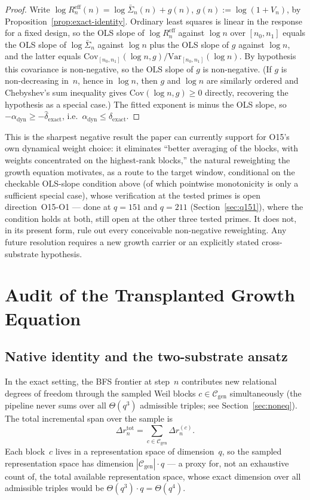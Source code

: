 \documentclass[11pt,a4paper]{article}
\newcommand{\Sn}{\bar{\Sigma}_n}
\newcommand{\dexact}{\hat{\delta}_{\mathrm{exact}}}
\newcommand{\Reff}{R_n^{\mathrm{eff}}}
\begin{document}
\begin{proof}
Write $\log\Reff(n) = \log\Sn(n) + g(n)$, $g(n):=\log(1+V_n)$, by
Proposition~\ref{prop:exact-identity}.
Ordinary least squares is linear in the response for a fixed design, so the
OLS slope of $\log\Reff$ against $\log n$ over $[n_0,n_1]$ equals the OLS
slope of $\log\Sn$ against $\log n$ plus the OLS slope of $g$ against
$\log n$, and the latter equals $\mathrm{Cov}_{[n_0,n_1]}(\log n,g)/
\mathrm{Var}_{[n_0,n_1]}(\log n)$.
By hypothesis this covariance is non-negative, so the OLS slope of $g$
is non-negative.
(If $g$ is non-decreasing in~$n$, hence in $\log n$, then $g$ and $\log n$
are similarly ordered and Chebyshev's sum inequality gives
$\mathrm{Cov}(\log n,g)\geq0$ directly, recovering the hypothesis as a
special case.)
The fitted exponent is minus the OLS slope, so
$-\alpha_{\mathrm{dyn}} \geq -\dexact$, i.e.\ $\alpha_{\mathrm{dyn}}\leq\dexact$.
\end{proof}

This is the sharpest negative result the paper can currently support for
O15's own dynamical weight choice: it eliminates ``better averaging of the
blocks, with weights concentrated on the highest-rank blocks,'' the natural
reweighting the growth equation motivates, as a route to the target window,
conditional on the checkable OLS-slope condition above (of which pointwise
monotonicity is only a sufficient special case), whose verification at the
tested primes is open direction~O15-O1 --- done at $q=151$ and $q=211$
(Section~\ref{sec:q151}), where the condition holds at both, still open
at the other three tested primes.
It does not, in its present form, rule out every conceivable non-negative
reweighting.
Any future resolution requires a new growth carrier or an explicitly stated
cross-substrate hypothesis.

\section{Audit of the Transplanted Growth Equation}
\label{sec:rederivation}

\subsection{Native identity and the two-substrate ansatz}

In the exact setting, the BFS frontier at step~$n$ contributes new
relational degrees of freedom through the sampled Weil blocks
$c\in\mathcal{C}_{\mathrm{gen}}$ simultaneously (the pipeline never sums
over all $\Theta(q^3)$ admissible triples; see Section~\ref{sec:noneq}).
The total incremental span over the sample is
\begin{equation}
\label{eq:totalspan}
\Delta r_n^{\mathrm{tot}}
= \sum_{c\in\mathcal{C}_{\mathrm{gen}}} \Delta r_n^{(c)}.
\end{equation}
Each block~$c$ lives in a representation space of dimension~$q$,
so the sampled representation space has dimension
$|\mathcal{C}_{\mathrm{gen}}| \cdot q$ — a proxy for, not an exhaustive
count of, the total available representation space, whose exact
dimension over all admissible triples would be $\Theta(q^3)\cdot q=\Theta(q^4)$.
\end{document}

